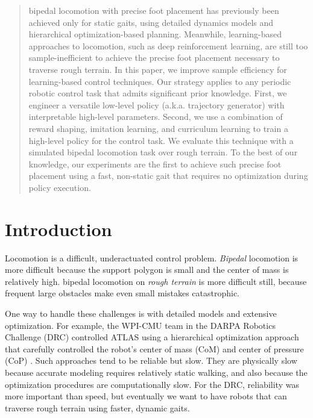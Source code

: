 \documentclass[conference]{IEEEtran}
\begin{document}
\begin{abstract}
  bipedal locomotion with precise foot placement has previously been achieved only for static gaits, using detailed dynamics models and hierarchical optimization-based planning.
  Meanwhile, learning-based approaches to locomotion, such as deep reinforcement learning, are still too sample-inefficient to achieve the precise foot placement necessary to traverse rough terrain.
  In this paper, we improve sample efficiency for learning-based control techniques.
  Our strategy applies to any periodic robotic control task that admits significant prior knowledge.
  First, we engineer a versatile low-level policy (a.k.a. trajectory generator) with interpretable high-level parameters.
  Second, we use a combination of reward shaping, imitation learning, and curriculum learning to train a high-level policy for the control task.
  We evaluate this technique with a simulated bipedal locomotion task over rough terrain.
  To the best of our knowledge, our experiments are the first to achieve such precise foot placement
  using a fast, non-static gait that requires no optimization during policy execution.
\end{abstract}

\IEEEpeerreviewmaketitle


\section{Introduction} \label{sec:intro}

Locomotion is a difficult, underactuated control problem.
\emph{Bipedal} locomotion is more difficult because the support polygon is small and the center of mass is relatively high.
bipedal locomotion on \emph{rough terrain} is more difficult still, because frequent large obstacles make even small mistakes catastrophic.

One way to handle these challenges is with detailed models and extensive optimization.
For example, the WPI-CMU team in the DARPA Robotics Challenge (DRC) controlled ATLAS using a hierarchical optimization approach that carefully controlled the robot's center of mass (CoM) and center of pressure (CoP) \citep{feng2015optimization}.
Such approaches tend to be reliable but slow.
They are physically slow because accurate modeling requires relatively static walking, and also because the optimization procedures are computationally slow.
For the DRC, reliability was more important than speed, but eventually we want to have robots that can traverse rough terrain using faster, dynamic gaits.
\end{document}
